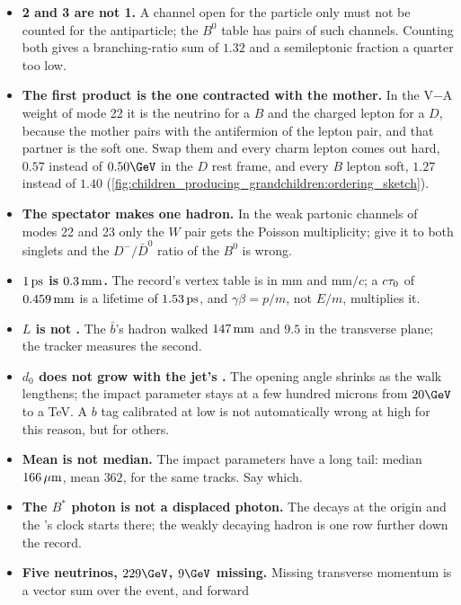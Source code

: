 \begin{pitfalls}
\begin{itemize}[nosep]
  \item \textbf{ 2 and 3 are not 1.} A channel open for the
    particle only must not be counted for the antiparticle; the $B^0$
    table has pairs of such channels. Counting both gives a branching-ratio
    sum of $1.32$ and a semileptonic fraction a quarter too low.
  \item \textbf{The first product is the one contracted with the mother.}
    In the V$-$A weight of mode 22 it is the neutrino for a $B$ and the
    charged lepton for a $D$, because the mother pairs with the
    antifermion of the lepton pair, and that partner is the soft one.
    Swap them and every charm lepton comes out hard, $0.57$ instead of
    $0.50\GeV$ in the $D$ rest frame, and every $B$ lepton soft, $1.27$
    instead of $1.40$
    (\cref{fig:children_producing_grandchildren:ordering_sketch}).
  \item \textbf{The spectator makes one hadron.} In the weak partonic
    channels of modes 22 and 23 only the $W$ pair gets the Poisson
    multiplicity; give it to both singlets and the $D^-/\bar D^0$ ratio
    of the $B^0$ is wrong.
  \item \textbf{$1\,\mathrm{ps}$ is $0.3\,\mathrm{mm}$.} The record's vertex table is in
    $\mathrm{mm}$ and $\mathrm{mm}/c$; a $c\tau_0$ of $0.459\,\mathrm{mm}$ is a
    lifetime of $1.53\,\mathrm{ps}$, and $\gamma\beta=p/m$, not $E/m$, multiplies it.
  \item \textbf{$L$ is not \Lxy.} The $\bar b$'s hadron walked $147\,\mathrm{mm}$
    and $9.5$ in the transverse plane; the tracker measures the second.
  \item \textbf{$d_0$ does not grow with the jet's \pt.} The opening angle
    shrinks as the walk lengthens; the impact parameter stays at a few
    hundred microns from $20\GeV$ to a TeV. A $b$ tag calibrated at low
    \pt is not automatically wrong at high \pt for this reason, but for
    others.
  \item \textbf{Mean is not median.} The impact parameters have a long
    tail: median $166\,\mu\mathrm{m}$, mean $362$, for the same tracks. Say which.
  \item \textbf{The $B^*$ photon is not a displaced photon.} The
    \Bstarbar decays at the origin and the \Bbar's clock starts there; the
    weakly decaying hadron is one row further down the record.
  \item \textbf{Five neutrinos, $229\GeV$, $9\GeV$ missing.} Missing
    transverse momentum is a vector sum over the event, and forward

\end{itemize}
\end{pitfalls}
